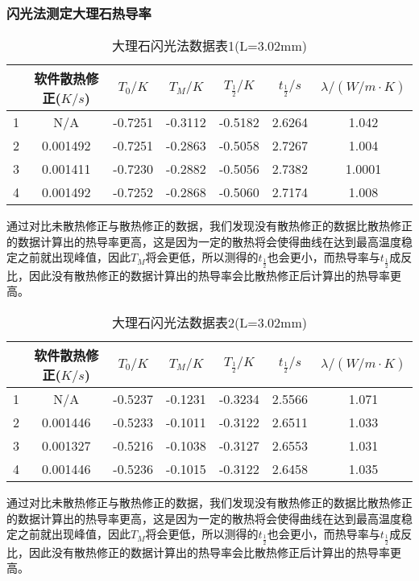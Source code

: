 \documentclass[UTF8]{ctexart}
\begin{document}
	\subsubsection{闪光法测定大理石热导率}
		\begin{table}[H]
		\centering
		\caption{大理石闪光法数据表1(L=3.02mm)}
		\begin{tabular}{|c|*{6}{c}|}
			\toprule[0.5mm]
			&软件散热修正($K/s$)&$T_{0}/K$&$T_{M}/K$&$T_{\frac{1}{2}}/K$&$t_{\frac{1}{2}}/s$&$\lambda/(W/m\cdot K)$\\
			\midrule
			1&N/A&-0.7251&-0.3112&-0.5182&2.6264&1.042\\
			2&0.001492&-0.7251&-0.2863&-0.5058&2.7267&1.004\\
			3&0.001411&-0.7230&-0.2882&-0.5056&2.7382&1.0001\\
			4&0.001492&-0.7252&-0.2868&-0.5060&2.7174&1.008\\
			\bottomrule[0.5mm]
		\end{tabular}
	\end{table}
\par 通过对比未散热修正与散热修正的数据，我们发现没有散热修正的数据比散热修正的数据计算出的热导率更高，这是因为一定的散热将会使得曲线在达到最高温度稳定之前就出现峰值，因此$T_{M}$将会更低，所以测得的$t_{\frac{1}{2}}$也会更小，而热导率与$t_{\frac{1}{2}}$成反比，因此没有散热修正的数据计算出的热导率会比散热修正后计算出的热导率更高。
	\begin{table}[H]
		\centering
		\caption{大理石闪光法数据表2(L=3.02mm)}
		\begin{tabular}{|c|*{6}{c}|}
			\toprule[0.5mm]
			&软件散热修正($K/s$)&$T_{0}/K$&$T_{M}/K$&$T_{\frac{1}{2}}/K$&$t_{\frac{1}{2}}/s$&$\lambda/(W/m\cdot K)$\\
			\midrule
			1&N/A&-0.5237&-0.1231&-0.3234&2.5566&1.071\\
			2&0.001446&-0.5233&-0.1011&-0.3122&2.6511&1.033\\
			3&0.001327&-0.5216&-0.1038&-0.3127&2.6553&1.031\\
			4&0.001446&-0.5236&-0.1015&-0.3122&2.6458&1.035\\
			\bottomrule[0.5mm]
		\end{tabular}
	\end{table}
\par 通过对比未散热修正与散热修正的数据，我们发现没有散热修正的数据比散热修正的数据计算出的热导率更高，这是因为一定的散热将会使得曲线在达到最高温度稳定之前就出现峰值，因此$T_{M}$将会更低，所以测得的$t_{\frac{1}{2}}$也会更小，而热导率与$t_{\frac{1}{2}}$成反比，因此没有散热修正的数据计算出的热导率会比散热修正后计算出的热导率更高。
\end{document}
